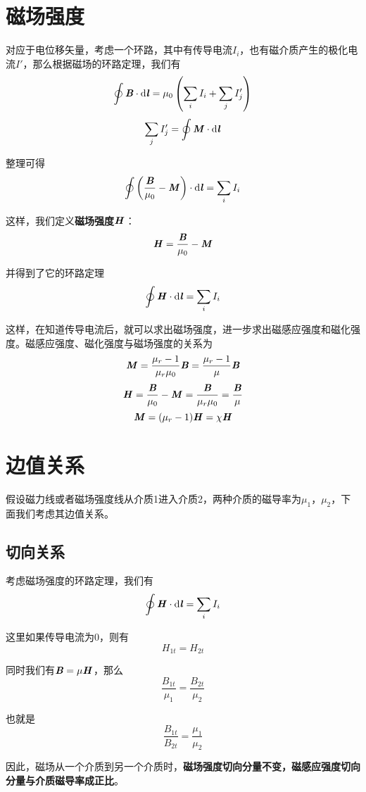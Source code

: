 \documentclass[UTF8,openany]{book}
\begin{document}
	\section{磁场强度}
	\par 对应于电位移矢量，考虑一个环路，其中有传导电流$I_i$，也有磁介质产生的极化电流$I'$，那么根据磁场的环路定理，我们有
	$$\oint\textbf{\textit{B}}\cdot\mathrm{d}\textbf{\textit{l}}=\mu_0\left(\sum_{i}I_i+\sum_{j}I'_j\right)$$
	$$\sum_{j}I'_j=\oint\textbf{\textit{M}}\cdot\mathrm{d}\textbf{\textit{l}}$$
	\par 整理可得
	$$\oint\left(\frac{\textbf{\textit{B}}}{\mu_0}-\textbf{\textit{M}}\right)\cdot\mathrm{d}\textbf{\textit{l}}=\sum_{i}I_i$$
	\par 这样，我们定义\textbf{磁场强度}$\textbf{\textit{H}}$：
	$$\textbf{\textit{H}}=\frac{\textbf{\textit{B}}}{\mu_0}-\textbf{\textit{M}}$$
	\par 并得到了它的环路定理
	$$\oint\textbf{\textit{H}}\cdot\mathrm{d}\textbf{\textit{l}}=\sum_{i}I_i$$
	\par 这样，在知道传导电流后，就可以求出磁场强度，进一步求出磁感应强度和磁化强度。磁感应强度、磁化强度与磁场强度的关系为
	$$\textbf{\textit{M}}=\frac{\mu_r-1}{\mu_r\mu_0}\textbf{\textit{B}}=\frac{\mu_r-1}{\mu}\textbf{\textit{B}}$$
	$$\textbf{\textit{H}}=\frac{\textbf{\textit{B}}}{\mu_0}-\textbf{\textit{M}}=
	\frac{\textbf{\textit{B}}}{\mu_r\mu_0}=\frac{\textbf{\textit{B}}}{\mu}$$
	$$\textbf{\textit{M}}=(\mu_r-1)\textbf{\textit{H}}=\chi\textbf{\textit{H}}$$
	\section{边值关系}
	\par 假设磁力线或者磁场强度线从介质1进入介质2，两种介质的磁导率为$\mu_1$，$\mu_2$，下面我们考虑其边值关系。
	\subsection{切向关系}
	\par 考虑磁场强度的环路定理，我们有
	$$\oint\textbf{\textit{H}}\cdot\mathrm{d}\textbf{\textit{l}}=\sum_{i}I_i$$
	\par 这里如果传导电流为0，则有
	$$H_{1t}=H_{2t}$$
	\par 同时我们有$\textbf{\textit{B}}=\mu\textbf{\textit{H}}$，那么
	$$\frac{B_{1t}}{\mu_1}=\frac{B_{2t}}{\mu_2}$$
	\par 也就是
	$$\frac{B_{1t}}{B_{2t}}=\frac{\mu_1}{\mu_2}$$
	\par 因此，磁场从一个介质到另一个介质时，\textbf{磁场强度切向分量不变，磁感应强度切向分量与介质磁导率成正比}。
\end{document}
